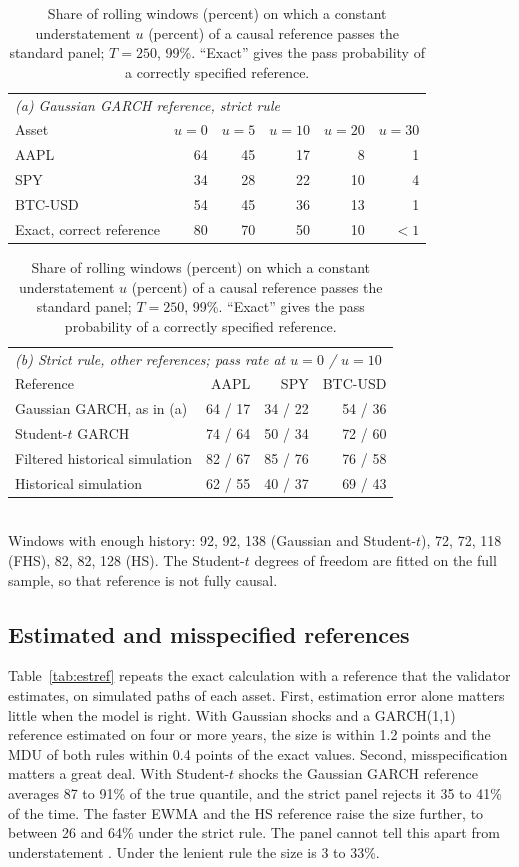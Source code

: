 \documentclass[11pt]{article}
\begin{document}
\begin{table}[tbp]
\caption{Share of rolling windows (percent) on which a constant understatement
$u$ (percent) of a causal reference passes the standard panel; $T = 250$,
99\%. ``Exact'' gives the pass probability of a correctly specified
reference.}
\label{tab:passrate}
\small
\centering
\begin{tabular}{lrrrrr}
\toprule
\multicolumn{6}{l}{\textit{(a) Gaussian GARCH reference, strict rule}} \\
Asset & $u = 0$ & $u = 5$ & $u = 10$ & $u = 20$ & $u = 30$ \\
\midrule
AAPL & 64 & 45 & 17 & 8 & 1 \\
SPY & 34 & 28 & 22 & 10 & 4 \\
BTC-USD & 54 & 45 & 36 & 13 & 1 \\
Exact, correct reference & 80 & 70 & 50 & 10 & $<1$ \\
\bottomrule
\end{tabular}

\vspace{8pt}
\begin{tabular}{lrrr}
\toprule
\multicolumn{4}{l}{\textit{(b) Strict rule, other references; pass rate at $u = 0$ / $u = 10$}} \\
Reference & AAPL & SPY & BTC-USD \\
\midrule
Gaussian GARCH, as in (a) & 64 / 17 & 34 / 22 & 54 / 36 \\
Student-$t$ GARCH & 74 / 64 & 50 / 34 & 72 / 60 \\
Filtered historical simulation & 82 / 67 & 85 / 76 & 76 / 58 \\
Historical simulation & 62 / 55 & 40 / 37 & 69 / 43 \\
\bottomrule
\end{tabular}
\\[2pt]
\footnotesize Windows with enough history: 92, 92, 138 (Gaussian and Student-$t$), 72, 72, 118 (FHS), 82, 82, 128 (HS). The Student-$t$ degrees of freedom are fitted on the full sample, so that reference is not fully causal.
\end{table}

\subsection{Estimated and misspecified references}
\label{sec:estref}

Table~\ref{tab:estref} repeats the exact calculation with a reference that the
validator estimates, on simulated paths of each asset. First, estimation error
alone matters little when the model is right. With Gaussian shocks and a GARCH(1,1) reference estimated on four or more years, the
size is within 1.2 points and the MDU of both rules within 0.4 points of the
exact values. Second, misspecification matters a great deal. With
Student-$t$ shocks the Gaussian GARCH reference averages 87 to 91\% of the
true quantile, and the strict panel rejects it 35 to 41\% of the time. The
faster EWMA and the HS reference raise the size further, to between 26 and
64\% under the strict rule. The panel cannot tell this apart from
understatement \citep{escanciano2010}. Under the lenient rule the size is 3 to
33\%. 
\end{document}
